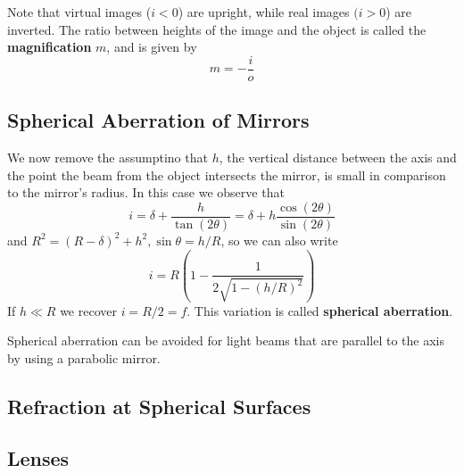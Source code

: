 \documentclass[12pt, a4paper, oneside, openright, titlepage]{book}
\begin{document}
Note that virtual images ($i < 0$) are upright, while real images $(i > 0$) are inverted. The ratio between heights of the image and the object is called the \textbf{magnification} $m$, and is given by
\begin{equation*}
    m = -\frac{i}{o}
\end{equation*}


\subsection{Spherical Aberration of Mirrors}

We now remove the assumptino that $h$, the vertical distance between the axis and the point the beam from the object intersects the mirror, is small in comparison to the mirror's radius. In this case we observe that
\begin{equation*}
    i = \delta + \frac{h}{\tan(2\theta)}=\delta + h\frac{\cos(2\theta)}{\sin(2\theta)}
\end{equation*}
and $R^2 = (R-\delta)^2+h^2,\sin\theta = h/R$, so we can also write
\begin{equation*}
    i = R\left(1-\frac{1}{2\sqrt{1-(h/R)^2}}\right)
\end{equation*}
If $h \ll R$ we recover $i = R/2 = f$. This variation is called \textbf{spherical aberration}.


Spherical aberration can be avoided for light beams that are parallel to the axis by using a parabolic mirror.


\subsection{Refraction at Spherical Surfaces}




\subsection{Lenses}
    
\end{document}
